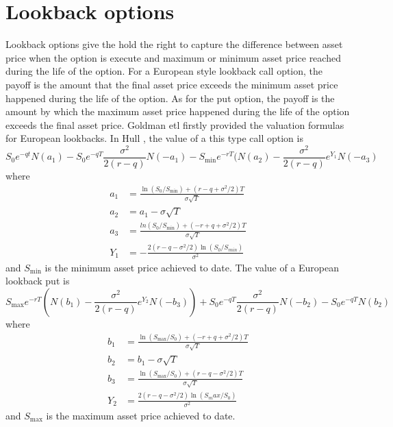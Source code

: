 \documentclass[11pt]{book}
\begin{document}
\section{Lookback options}
Lookback options give the hold the right to capture the difference between asset price when the option is execute and maximum or minimum asset price reached during the life of the option. For a European style lookback call option, the payoff is the amount that the final asset price exceeds the minimum asset price happened during the life of the option. As for the put option, the payoff is the amount by which the maximum asset price happened during the life of the option exceeds the final asset price. Goldman etl firstly provided the valuation formulas for European lookbacks. In Hull \cite{Hull2008}, the value of a this type call option is 
\begin{equation}\label{eq:3}
S_0e^{-qt}N(a_1) - S_0 e^{-qT}\frac{\sigma ^2}{2(r-q)} N(-a_1) - S_{\min} e^{-rT}(N(a_2) - \frac{\sigma^2}{2(r-q)} e ^{Y_1} N(-a_3) 
\end{equation}
where
\begin{equation}\label{eq:4}
\begin{split}
a_1 &=\frac{\ln(S_0 / S_{\min}) + (r-q+\sigma^2 /2)T}{\sigma \sqrt{T}}\\
a_2 &= a_1 - \sigma \sqrt{T}\\
a_3 &= \frac{ln(S_0 / S_{\min})+ (-r+q+\sigma^2 / 2)T}{\sigma \sqrt{T}}\\
Y_1 &= - \frac{2(r-q-\sigma^2 / 2) \ln(S_0 / S_{min})}{\sigma^2}
\end{split}
\end{equation}
and $S_{\min}$ is the minimum asset price achieved to date. 
The value of a European lookback put is 
\begin{equation}\label{eq:5}
S_{\max} e^{-rT} ( N(b_1) - \frac{\sigma^2}{2(r-q)} e^{Y_2} N(-b_3)) + S_0 e^{-qT}\frac{\sigma^2}{2(r-q)} N(-b_2) - S_0 e^{-qT} N(b_2)
\end{equation}
where 
\begin{equation}\label{eq:6}
\begin{split}
b_1 &= \frac{\ln(S_{\max} / S_0) + (-r + q + \sigma^2 /2)T}{\sigma \sqrt{T}}\\
b_2 &= b_1 - \sigma \sqrt{T}\\
b_3 &= \frac{\ln(S_{\max} / S_0) + (r-q-\sigma^2 /2)T}{\sigma \sqrt{T}}\\
Y_2 &= \frac{2(r-q-\sigma^2 / 2) \ln(S_max / S_0)}{\sigma^2}
\end{split}
\end{equation}
and $S_{\max}$ is the maximum asset price achieved to date. 
\end{document}

